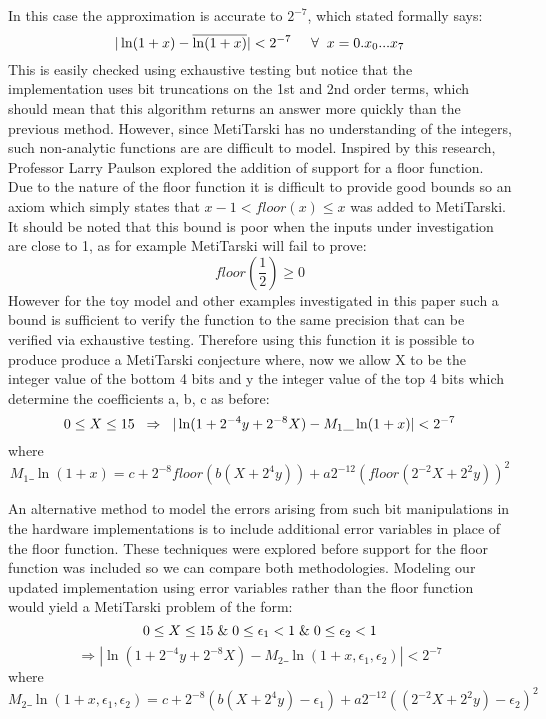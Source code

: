 \documentclass[a4]{article}
\begin{document}
\noindent In this case the approximation is accurate to $2^{-7}$, which stated formally says: 
\begin{equation}
|\ln(1+x)-\overline{\ln(1+x)}|<2^{-7}\hspace{0.5cm} \forall \hspace{0.2cm} x= 0.x_0...x_7
\end{equation}
This is easily checked using exhaustive testing but notice that the implementation uses bit truncations on the 1st and 2nd order terms, which should mean that this algorithm returns an answer more quickly than the previous method. However, since MetiTarski has no understanding of the integers, such non-analytic functions are are difficult to model. Inspired by this research, Professor Larry Paulson explored the addition of support for a floor function. Due to the nature of the floor function it is difficult to provide good bounds so an axiom which simply states that $x-1< floor(x)\le x $ was added to MetiTarski. It should be noted that this bound is poor when the inputs under investigation are close to 1, as for example MetiTarski will fail to prove:
$$floor(\frac{1}{2})\geq 0$$
However for the toy model and other examples investigated in this paper such a bound is sufficient to verify the function to the same precision that can be verified via exhaustive testing. Therefore using this function it is possible to produce produce a MetiTarski conjecture where, now we allow X to be the integer value of the bottom 4 bits and y the integer value of the top 4 bits which determine the coefficients a, b, c as before:
\begin{equation}
0\le X \le 15 \hspace{0.2cm} \Rightarrow \hspace{0.2cm}|\ln(1+2^{-4}y+2^{-8}X) - M_1\_\ln(1+x)|<2^{-7}
\end{equation}
where $$M_1\_\ln(1+x)=c+2^{-8}floor(b(X+2^{4}y))+a2^{-12}(floor(2^{-2}X+2^{2}y))^2$$

\noindent An alternative method to model the errors arising from such bit manipulations in the hardware implementations is to include additional error variables in place of the floor function. These techniques were explored before support for the floor function was included so we can compare both methodologies. Modeling our updated implementation using error variables rather than the floor function would yield a MetiTarski problem of the form:
$$0\le X \le 15 \hspace{0.1cm} \& \hspace{0.1cm} 0\le \epsilon_1<1\hspace{0.1cm} \& \hspace{0.1cm} 0\le \epsilon_2<1 $$
\begin{equation}
\Rightarrow |\ln(1+2^{-4}y+2^{-8}X) - M_2\_\ln(1+x,\epsilon_1,\epsilon_2)|<2^{-7}
\end{equation}
where
$$M_2\_\ln(1+x,\epsilon_1,\epsilon_2)=c+2^{-8}(b(X+2^{4}y)-\epsilon_1)+a2^{-12}((2^{-2}X+2^{2}y)-\epsilon_2)^2$$
\end{document}
